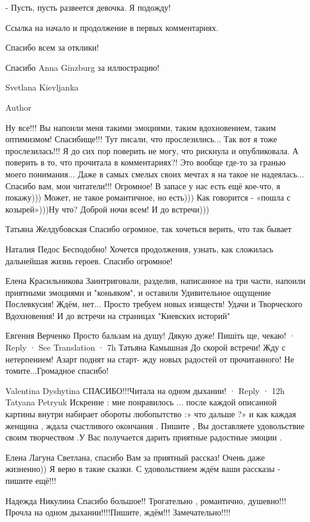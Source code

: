 - Пусть, пусть развеется девочка. Я подожду! 

Ссылка на начало и продолжение в первых комментариях.

Спасибо всем за отклики! 

Спасибо Anna Ginzburg за иллюстрацию!

Svetlana Kievljanka

Author

Ну все!!! Вы напоили меня такими эмоциями, таким вдохновением, таким оптимизмом!
Спасибище!!! Тут писали, что прослезились... Так вот я тоже прослезилась!!! Я до
сих пор поверить не могу, что рискнула и опубликовала. А поверить в то, что
прочитала в комментариях?! Это вообще где-то за гранью моего понимания... Даже в
самых смелых своих мечтах я на такое не надеялась... Спасибо вам, мои читатели!!!
Огромное! В запасе у нас есть ещё кое-что, я покажу))) Может, не такое
романтичное, но есть))) Как говорится - «пошла с козырей»)))Ну что? Доброй ночи
всем! И до встречи)))

Татьяна Желдубовская
Спасибо огромное, так хочеться верить, что так бывает

Наталия Педос
Бесподобно! Хочется продолжения, узнать, как сложилась дальнейшая жизнь героев.
Спасибо огромное!

Елена Красильникова
Заинтриговали, разделив, написанное на три части, напоили приятными эмоциями и "коньяком", и оставили Удивительное ощущение Послевкусия!
Ждём, нет... Просто требуем новых изяществ!
Удачи и Творческого Вдохновения! И до встречи на страницах "Киевских историй"

Евгения Верченко
Просто бальзам на душу! Дякую дуже! Пишіть ще, чекаю!
 · Reply · See Translation · 7h
Татьяна Камышная
До скорой встречи! Жду с нетерпением! Азарт поднят на старт- жду новых радостей от прочитанного! Не томите...Громадное спасибо!

Valentina Dyshytina
СПАСИБО!!!Читала на одном дыхании!
 · Reply · 12h
Tatyana Petryuk
Искренне : мне понравилось ... после каждой описанной картины внутри набирает обороты любопытство :» что дальше ?» и как каждая женщина , ждала счастливого окончания .
Пишите , Вы доставляете удовольствие своим творчеством .У Вас получается дарить приятные радостные эмоции .

Елена Лагуна
Светлана, спасибо Вам за приятный рассказ! Очень даже жизненно)) Я верю в такие сказки. С удовольствием ждём ваши рассказы - пишите ещё!!!

Надежда Никулина
Спасибо большое!! Трогательно , романтично, душевно!!!Прочла на одном дыхании!!!!Пишите, ждём!!! Замечательно!!!!

